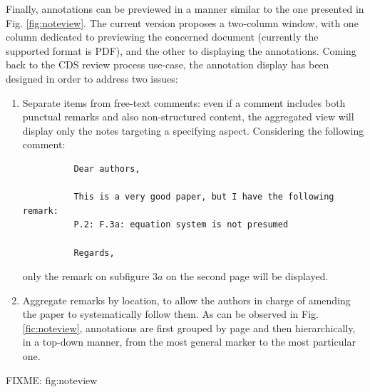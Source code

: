 Finally, annotations can be previewed in a manner similar to the one presented
in Fig. \ref{fig:noteview}. The current version proposes a two-column window,
with one column dedicated to previewing the concerned document (currently the
supported format is PDF), and the other to displaying the annotations. Coming
back to the CDS review process use-case, the annotation display has been
designed in order to address two issues:
\begin{enumerate}
  \item Separate items from free-text comments: even if a comment includes both
        punctual remarks and also non-structured content, the aggregated view
        will display only the notes targeting a specifying aspect. Considering the
        following comment:
        \begin{verbatim}
          Dear authors,

          This is a very good paper, but I have the following remark:
          P.2: F.3a: equation system is not presumed 

          Regards,
        \end{verbatim}
        only the remark on subfigure $3a$ on the second page will be displayed.
  \item Aggregate remarks by location, to allow the authors in charge of
        amending the paper to systematically follow them. As can be observed in
        Fig. \ref{fic:noteview}, annotations are first grouped by page and then
        hierarchically, in a top-down manner, from the most general marker to
        the most particular one.
\end{enumerate}

FIXME: fig:noteview
